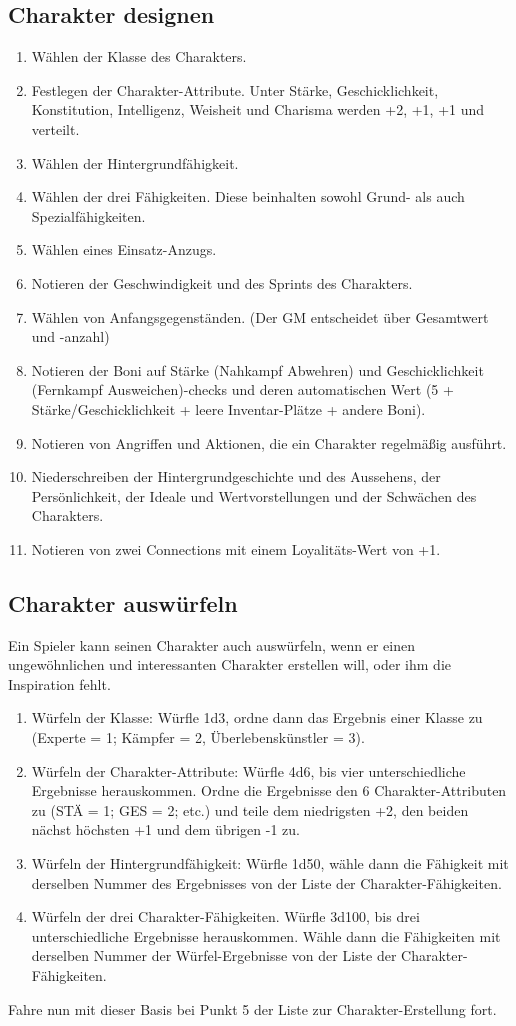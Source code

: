 \subsection{Charakter designen}
\begin{enumerate}
\item Wählen der Klasse des Charakters.
\item Festlegen der Charakter-Attribute. Unter Stärke, Geschicklichkeit, Konstitution, Intelligenz, Weisheit und Charisma werden \glqq +2\grqq{}, \glqq +1\grqq{}, \glqq +1\grqq{} und \grqq{} verteilt.
\item Wählen der Hintergrundfähigkeit.
\item Wählen der drei Fähigkeiten. Diese beinhalten sowohl Grund- als auch Spezialfähigkeiten.
\item Wählen eines Einsatz-Anzugs.
\item Notieren der Geschwindigkeit und des Sprints des Charakters.
\item Wählen von Anfangsgegenständen. (Der GM entscheidet über Gesamtwert und -anzahl)
\item Notieren der Boni auf Stärke (Nahkampf Abwehren) und Geschicklichkeit (Fernkampf Ausweichen)-checks und deren automatischen Wert (5 + Stärke/Geschicklichkeit + leere Inventar-Plätze + andere Boni).
\item Notieren von Angriffen und Aktionen, die ein Charakter regelmäßig ausführt.
\item Niederschreiben der Hintergrundgeschichte und des Aussehens, der Persönlichkeit, der Ideale und Wertvorstellungen und der Schwächen des Charakters.
\item Notieren von zwei Connections mit einem Loyalitäts-Wert von +1.
\end{enumerate}
\subsection{Charakter auswürfeln}
Ein Spieler kann seinen Charakter auch auswürfeln, wenn er einen ungewöhnlichen und interessanten Charakter erstellen will, oder ihm die Inspiration fehlt.
\begin{enumerate}
\item Würfeln der Klasse: Würfle 1d3, ordne dann das Ergebnis einer Klasse zu (Experte = 1; Kämpfer = 2, Überlebenskünstler = 3).
\item Würfeln der Charakter-Attribute: Würfle 4d6, bis vier unterschiedliche Ergebnisse herauskommen. Ordne die Ergebnisse den 6 Charakter-Attributen zu (STÄ = 1; GES = 2; etc.) und teile dem niedrigsten \grqq{}+2\grqq{}, den beiden nächst höchsten \grqq{}+1\grqq{} und dem übrigen \grqq{}-1\grqq{} zu.
\item Würfeln der Hintergrundfähigkeit: Würfle 1d50, wähle dann die Fähigkeit mit derselben Nummer des Ergebnisses von der Liste der Charakter-Fähigkeiten.
\item Würfeln der drei Charakter-Fähigkeiten. Würfle 3d100, bis drei unterschiedliche Ergebnisse herauskommen. Wähle dann die Fähigkeiten mit derselben Nummer der Würfel-Ergebnisse von der Liste der Charakter-Fähigkeiten.
\end{enumerate}
Fahre nun mit dieser Basis bei Punkt 5 der Liste zur Charakter-Erstellung fort.

